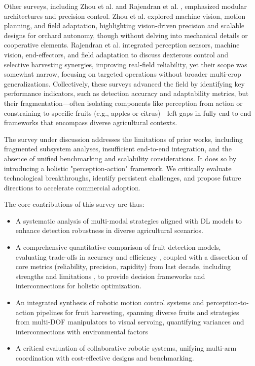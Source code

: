\documentclass[a4paper,fleqn]{cas-dc}
\begin{document}
Other surveys, including Zhou et al. \cite{zhou2022intelligent} and Rajendran et al. \cite{rajendran2024towards}, emphasized modular architectures and precision control. Zhou et al. explored machine vision, motion planning, and field adaptation, highlighting vision-driven precision and scalable designs for orchard autonomy, though without delving into mechanical details or cooperative elements. Rajendran et al. integrated perception sensors, machine vision, end-effectors, and field adaptation to discuss dexterous control and selective harvesting synergies, improving real-field reliability, yet their scope was somewhat narrow, focusing on targeted operations without broader multi-crop generalizations. Collectively, these surveys advanced the field by identifying key performance indicators, such as detection accuracy and adaptability metrics, but their fragmentation—often isolating components like perception from action or constraining to specific fruits (e.g., apples or citrus)—left gaps in fully end-to-end frameworks that encompass diverse agricultural contexts.

The survey under discussion addresses the limitations of prior works, including fragmented subsystem analyses, insufficient end-to-end integration, and the absence of unified benchmarking and scalability considerations. It does so by introducing a holistic "perception-action" framework.
We critically evaluate technological breakthroughs, identify persistent challenges, and propose future directions to accelerate commercial adoption.

The core contributions of this survey are thus:
\begin{itemize}
\item A systematic analysis of multi-modal strategies aligned with DL models to enhance detection robustness in diverse agricultural scenarios.

\item A comprehensive quantitative comparison of fruit detection models, evaluating trade-offs in accuracy 
 and efficiency 
, coupled with a dissection of core metrics (reliability, precision, rapidity) from last decade, including strengths 
and limitations 
, to provide decision frameworks and interconnections for holistic optimization.

\item An integrated synthesis of robotic motion control systems and perception-to-action pipelines for fruit harvesting, spanning diverse fruits and strategies from multi-DOF manipulators to visual servoing, quantifying variances 
and interconnections with environmental factors

\item A critical evaluation of collaborative robotic systems, unifying multi-arm coordination with cost-effective designs and benchmarking.
\end{itemize}
\end{document}
